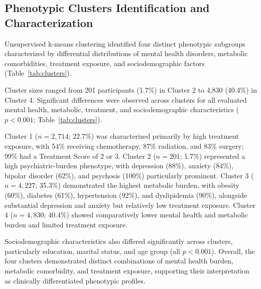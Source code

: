 \documentclass[11pt]{article}
\begin{document}
\subsection{Phenotypic Clusters Identification and Characterization}
Unsupervised k-means clustering identified four distinct phenotypic subgroups characterized by differential distributions of mental health disorders, metabolic comorbidities, treatment exposure, and sociodemographic factors (Table~\ref{tab:clusters}). 

Cluster sizes ranged from 201 participants (1.7\%) in Cluster 2 to 4,830 (40.4\%) in Cluster 4. Significant differences were observed across clusters for all evaluated mental health, metabolic, treatment, and sociodemographic characteristics ($p < 0.001$; Table~\ref{tab:clusters}).

Cluster 1 ($n = 2,714$; 22.7\%) was characterized primarily by high treatment exposure, with 54\% receiving chemotherapy, 87\% radiation, and 83\% surgery; 99\% had a Treatment Score of 2 or 3. Cluster 2 ($n = 201$; 1.7\%) represented a high psychiatric-burden phenotype, with depression (88\%), anxiety (84\%), bipolar disorder (62\%), and psychosis (100\%) particularly prominent. Cluster 3 ($n = 4,227$; 35.3\%) demonstrated the highest metabolic burden, with obesity (60\%), diabetes (61\%), hypertension (92\%), and dyslipidemia (90\%), alongside substantial depression and anxiety but relatively low treatment exposure. Cluster 4 ($n = 4,830$; 40.4\%) showed comparatively lower mental health and metabolic burden and limited treatment exposure.

Sociodemographic characteristics also differed significantly across clusters, particularly education, marital status, and age group (all $p < 0.001$). Overall, the four clusters demonstrated distinct combinations of mental health burden, metabolic comorbidity, and treatment exposure, supporting their interpretation as clinically differentiated phenotypic profiles.
\end{document}
